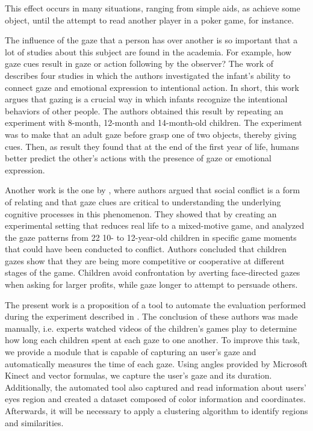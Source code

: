 \documentclass[10pt, conference]{IEEEtran}
\begin{document}
	This effect occurs in many situations, ranging from simple aids, as achieve some object, until the attempt to read another player in a poker game, for instance.

	The influence of the gaze that a person has over another is so important that a lot of studies about this subject are found in the academia. 
	For example, how gaze cues result in gaze or action following by the observer? 
	The work of \cite{5} describes four studies in which the authors investigated the infant's ability to connect gaze and emotional expression to intentional action.
	In short, this work argues that gazing is a crucial way in which infants recognize the intentional behaviors of other people. 
	The authors obtained this result by repeating an experiment with 8-month, 12-month and 14-month-old children. 
	The experiment was to make that an adult gaze before grasp one of two objects, thereby giving cues. 
	Then, as result they found that at the end of the first year of life, humans better predict the other's actions with the presence of gaze or emotional expression.
    
	Another work is the one by \cite{6}, where authors argued that social conflict is a form of relating and that gaze clues are critical to understanding the underlying cognitive processes in this phenomenon. 
	They showed that by creating an experimental setting that reduces real life to a mixed-motive game, and analyzed the gaze patterns from 22 10- to 12-year-old children in specific game moments that could have been conducted to conflict.
	Authors concluded that children gazes show that they are being more competitive or cooperative at different stages of the game.
	Children avoid confrontation by averting face-directed gazes when asking for larger profits, while gaze longer to attempt to persuade others.

	The present work is a proposition of a tool to automate the evaluation performed during the experiment described in \cite{6}.
	The conclusion of these authors was made manually, i.e. experts watched videos of the children's games play to determine how long each children spent at each gaze to one another.
	To improve this task, we provide a module that is capable of capturing an user's gaze and automatically measures the time of each gaze.
	Using angles provided by Microsoft Kinect and vector formulas, we capture the user's gaze and its duration.
	Additionally, the automated tool also captured and read information about users' eyes region and created a dataset composed of color information and coordinates.
	Afterwards, it will be necessary to apply a clustering algorithm to identify regions and similarities. 
\end{document}
